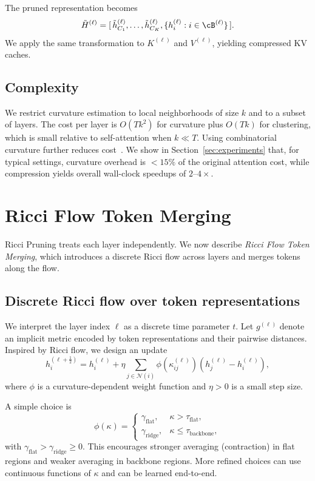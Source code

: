 \documentclass{article}
\theoremstyle{plain}
\theoremstyle{definition}
\theoremstyle{remark}
\newcommand{\cN}{\mathcal{N}}
\begin{document}
The pruned representation becomes
\begin{equation}
  \tilde{H}^{(\ell)} = [\,\tilde{h}^{(\ell)}_{C_1},\dots,\tilde{h}^{(\ell)}_{C_K},\{h^{(\ell)}_i : i \in \cB^{(\ell)}\}\,].
\end{equation}
We apply the same transformation to $K^{(\ell)}$ and $V^{(\ell)}$, yielding compressed KV caches.

\subsection{Complexity}

We restrict curvature estimation to local neighborhoods of size $k$ and to a subset of layers. The cost per layer is $O(T k^2)$ for curvature plus $O(Tk)$ for clustering, which is small relative to self-attention when $k \ll T$. Using combinatorial curvature further reduces cost~\citep{forman2003bochner,weber2024discrete}. We show in Section~\ref{sec:experiments} that, for typical settings, curvature overhead is $<15\%$ of the original attention cost, while compression yields overall wall-clock speedups of $2$--$4\times$.

\section{Ricci Flow Token Merging}
\label{sec:ricci_flow}

Ricci Pruning treats each layer independently. We now describe \emph{Ricci Flow Token Merging}, which introduces a discrete Ricci flow across layers and merges tokens along the flow.

\subsection{Discrete Ricci flow over token representations}

We interpret the layer index $\ell$ as a discrete time parameter $t$. Let $g^{(\ell)}$ denote an implicit metric encoded by token representations and their pairwise distances. Inspired by Ricci flow, we design an update
\begin{equation}
  h^{(\ell+\frac{1}{2})}_i
  = h^{(\ell)}_i + \eta \sum_{j\in \cN(i)} \phi(\kappa^{(\ell)}_{ij}) (h^{(\ell)}_j - h^{(\ell)}_i),
  \label{eq:ricci-flow-update}
\end{equation}
where $\phi$ is a curvature-dependent weight function and $\eta>0$ is a small step size.

A simple choice is
\begin{equation}
  \phi(\kappa) =
    \begin{cases}
      \gamma_\mathrm{flat}, & \kappa > \tau_\mathrm{flat}, \\
      \gamma_\mathrm{ridge}, & \kappa \le \tau_\mathrm{backbone},
    \end{cases}
\end{equation}
with $\gamma_\mathrm{flat} > \gamma_\mathrm{ridge} \ge 0$. This encourages stronger averaging (contraction) in flat regions and weaker averaging in backbone regions. More refined choices can use continuous functions of $\kappa$ and can be learned end-to-end.
\end{document}

